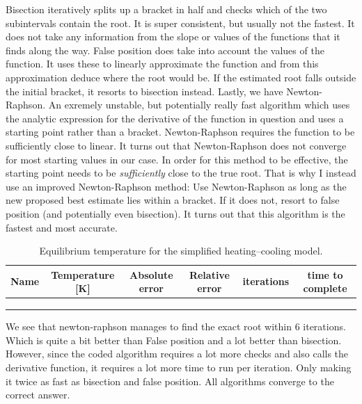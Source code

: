 \documentclass{article}
\newcommand{\CalcDir}{Calculations}
\begin{document}
Bisection iteratively splits up a bracket in half and checks which of the two subintervals contain the root. 
It is super consistent, but usually not the fastest. 
It does not take any information from the slope or values of the functions that it finds along the way. 
False position does take into account the values of the function. It uses these to linearly approximate the function
and from this approximation deduce where the root would be. If the estimated root falls outside the initial bracket,
it resorts to bisection instead. 
Lastly, we have Newton-Raphson. An exremely unstable, but potentially really fast algorithm which uses 
the analytic expression for the derivative of the function in question and uses a starting point rather than a bracket. 
Newton-Raphson requires the function to be sufficiently close to linear. 
It turns out that Newton-Raphson does not converge for most starting values in our case.
In order for this method to be effective, the starting point needs to be \textit{sufficiently} close to the true root.
That is why I instead use an improved Newton-Raphson method: Use Newton-Raphson as long as the new proposed best estimate lies
within a bracket. If it does not, resort to false position (and potentially even bisection). It turns out that this 
algorithm is the fastest and most accurate.


\begin{table}[H]
\centering
\caption{Equilibrium temperature for the simplified heating–cooling model.}
\begin{tabular}{|c|c|c|c|c|c|}
\hline
Name & Temperature [K] & Absolute error & Relative error & iterations & time to complete \\
\hline
 \\
 \\
 \\
\hline
\end{tabular}
\end{table}

We see that newton-raphson manages to find the exact root within 6 iterations. Which is quite a bit better
than False position and a lot better than bisection. However, since the coded algorithm requires a lot more checks 
and also calls the derivative function, it requires a lot more time to run per iteration. Only making it twice as fast 
as bisection and false position. All algorithms converge to the correct answer. 
\end{document}
